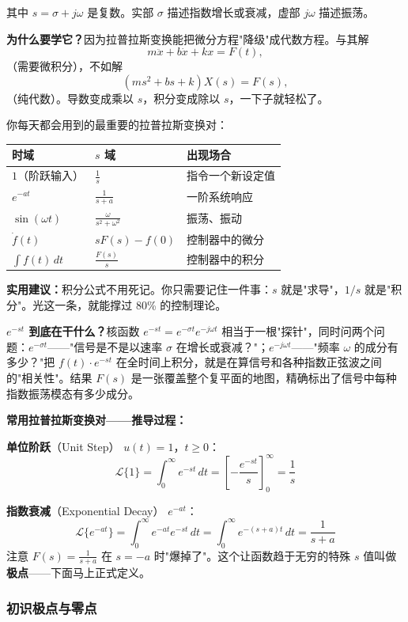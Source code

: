 其中 $s = \sigma + j\omega$ 是复数。实部 $\sigma$ 描述指数增长或衰减，虚部 $j\omega$ 描述振荡。

\textbf{为什么要学它？}因为拉普拉斯变换能把微分方程"降级"成代数方程。与其解
\[
m\ddot{x} + b\dot{x} + kx = F(t),
\]
（需要微积分），不如解
\[
(ms^2 + bs + k)X(s) = F(s),
\]
（纯代数）。导数变成乘以 $s$，积分变成除以 $s$，一下子就轻松了。

你每天都会用到的最重要的拉普拉斯变换对：

\begin{center}
\begin{tabular}{lll}
\toprule
\textbf{时域} & \textbf{$s$ 域} & \textbf{出现场合} \\
\midrule
$1$（阶跃输入） & $\frac{1}{s}$ & 指令一个新设定值 \\
$e^{-at}$ & $\frac{1}{s+a}$ & 一阶系统响应 \\
$\sin(\omega t)$ & $\frac{\omega}{s^2 + \omega^2}$ & 振荡、振动 \\
$\dot{f}(t)$ & $sF(s) - f(0)$ & 控制器中的微分 \\
$\int f(t)\,dt$ & $\frac{F(s)}{s}$ & 控制器中的积分 \\
\bottomrule
\end{tabular}
\end{center}

\textbf{实用建议：}积分公式不用死记。你只需要记住一件事：$s$ 就是"求导"，$1/s$ 就是"积分"。光这一条，就能撑过 80\% 的控制理论。

\textbf{$e^{-st}$ 到底在干什么？}核函数 $e^{-st} = e^{-\sigma t} e^{-j\omega t}$ 相当于一根"探针"，同时问两个问题：$e^{-\sigma t}$——"信号是不是以速率 $\sigma$ 在增长或衰减？"；$e^{-j\omega t}$——"频率 $\omega$ 的成分有多少？"把 $f(t) \cdot e^{-st}$ 在全时间上积分，就是在算信号和各种指数正弦波之间的"相关性"。结果 $F(s)$ 是一张覆盖整个复平面的地图，精确标出了信号中每种指数振荡模态有多少成分。

\textbf{常用拉普拉斯变换对——推导过程：}

\textbf{单位阶跃}（Unit Step） $u(t) = 1$，$t \geq 0$：
\[
\mathcal{L}\{1\} = \int_0^{\infty} e^{-st} \, dt = \left[-\frac{e^{-st}}{s}\right]_0^{\infty} = \frac{1}{s}
\]

\textbf{指数衰减}（Exponential Decay） $e^{-at}$：
\[
\mathcal{L}\{e^{-at}\} = \int_0^{\infty} e^{-at} e^{-st} \, dt = \int_0^{\infty} e^{-(s+a)t} \, dt = \frac{1}{s+a}
\]
注意 $F(s) = \frac{1}{s+a}$ 在 $s = -a$ 时"爆掉了"。这个让函数趋于无穷的特殊 $s$ 值叫做\textbf{极点}——下面马上正式定义。

\subsubsection{初识极点与零点}


